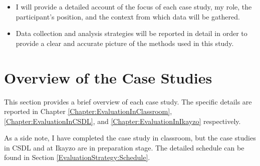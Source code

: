 \begin{itemize}
	\item I will provide a detailed account of the focus of each case study, my role, the participant's position, and the context from which data will be gathered.%
	
	
	\item Data collection and analysis strategies will be reported in detail in order to provide a clear and accurate picture of the methods used in this study.
\end{itemize}
















\section{Overview of the Case Studies} \label{EvaluationStrategy:CaseStudyOverview}

This section provides a brief overview of each case study. The specific details are reported in Chapter \ref{Chapter:EvaluationInClassroom}, \ref{Chapter:EvaluationInCSDL}, and \ref{Chapter:EvaluationInIkayzo} respectively.

As a side note, I have completed the case study in classroom, but the case studies in CSDL and at Ikayzo are in preparation stage. The detailed schedule can be found in Section \ref{EvaluationStrategy:Schedule}.


